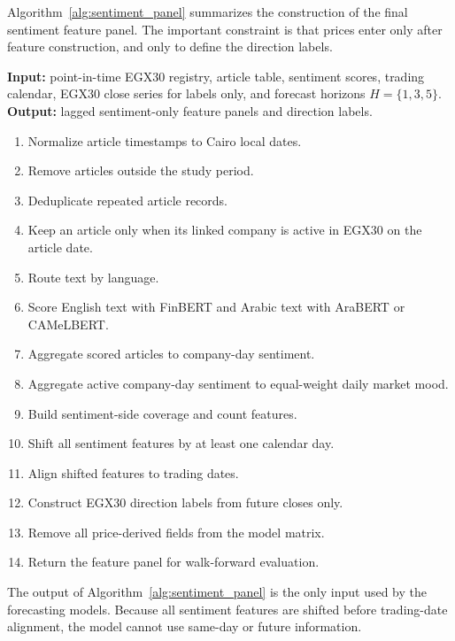 Algorithm~\ref{alg:sentiment_panel} summarizes the construction of the final sentiment feature panel. The important constraint is that prices enter only after feature construction, and only to define the direction labels.

\begin{algorithm}[H]
\caption{Sentiment Feature Panel Construction}
\label{alg:sentiment_panel}
\small
\textbf{Input:} point-in-time EGX30 registry, article table, sentiment scores, trading calendar, EGX30 close series for labels only, and forecast horizons $H=\{1,3,5\}$.\\
\textbf{Output:} lagged sentiment-only feature panels and direction labels.
\begin{enumerate}
  \setlength{\itemsep}{0.15em}
  \item Normalize article timestamps to Cairo local dates.
  \item Remove articles outside the study period.
  \item Deduplicate repeated article records.
  \item Keep an article only when its linked company is active in EGX30 on the article date.
  \item Route text by language.
  \item Score English text with FinBERT and Arabic text with AraBERT or CAMeLBERT.
  \item Aggregate scored articles to company-day sentiment.
  \item Aggregate active company-day sentiment to equal-weight daily market mood.
  \item Build sentiment-side coverage and count features.
  \item Shift all sentiment features by at least one calendar day.
  \item Align shifted features to trading dates.
  \item Construct EGX30 direction labels from future closes only.
  \item Remove all price-derived fields from the model matrix.
  \item Return the feature panel for walk-forward evaluation.
\end{enumerate}
\end{algorithm}

The output of Algorithm~\ref{alg:sentiment_panel} is the only input used by the forecasting models. Because all sentiment features are shifted before trading-date alignment, the model cannot use same-day or future information.

